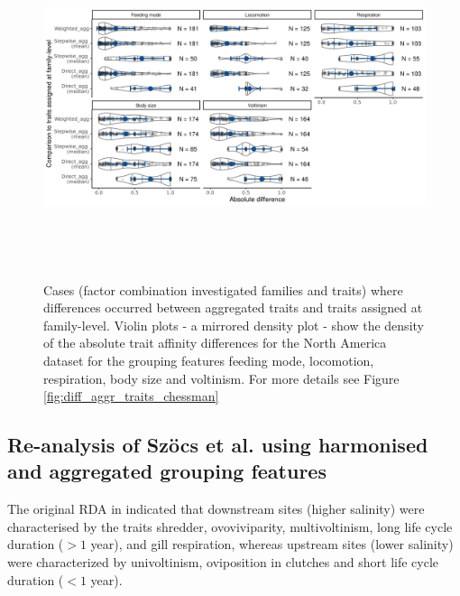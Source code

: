 \documentclass{article}
\begin{document}
\begin{figure}[H]
  \centering
  \includegraphics[width=16.5cm, height=10cm]{Deviances_trait_agg_pyne.png}
  \caption{Cases (factor combination investigated families and traits) where differences occurred between aggregated traits and traits assigned at family-level. Violin plots - a mirrored density plot - show the density of the absolute trait affinity differences for the North America dataset for the grouping features feeding mode, locomotion, respiration, body size and voltinism. For more details see Figure \ref{fig:diff_aggr_traits_chessman}}
  \label{fig:diff_aggr_traits_pyne}
\end{figure}

\newpage 


\subsection*{Re-analysis of Szöcs et al. using harmonised and aggregated grouping features}

The original RDA in \citet{szocs_effects_2014} indicated that downstream sites (higher salinity) were characterised by the traits shredder, ovoviviparity, multivoltinism, long life cycle duration ($> 1$ year), and gill respiration, whereas upstream sites (lower salinity) were characterized by univoltinism, oviposition in clutches and short life cycle duration ($< 1$ year). 

\end{document}
